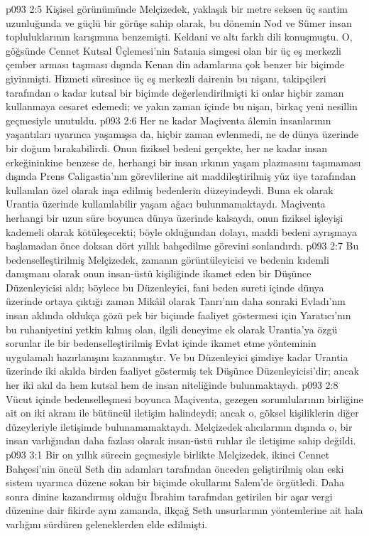 \vs p093 2:5 Kişisel görünümünde Melçizedek, yaklaşık bir metre seksen üç santim uzunluğunda ve güçlü bir görüşe sahip olarak, bu dönemin Nod ve Sümer insan topluluklarının karışımına benzemişti. Keldani ve altı farklı dili konuşmuştu. O, göğsünde Cennet Kutsal Üçlemesi’nin Satania simgesi olan bir üç eş merkezli çember arması taşıması dışında Kenan din adamlarına çok benzer bir biçimde giyinmişti. Hizmeti süresince üç eş merkezli dairenin bu nişanı, takipçileri tarafından o kadar kutsal bir biçimde değerlendirilmişti ki onlar hiçbir zaman kullanmaya cesaret edemedi; ve yakın zaman içinde bu nişan, birkaç yeni nesillin geçmesiyle unutuldu.
\vs p093 2:6 Her ne kadar Maçiventa âlemin insanlarının yaşantıları uyarınca yaşamışsa da, hiçbir zaman evlenmedi, ne de dünya üzerinde bir doğum bırakabilirdi. Onun fiziksel bedeni gerçekte, her ne kadar insan erkeğininkine benzese de, herhangi bir insan ırkının yaşam plazmasını taşımaması dışında Prens Caligastia’nın görevlilerine ait maddileştirilmiş yüz üye tarafından kullanılan özel olarak inşa edilmiş bedenlerin düzeyindeydi. Buna ek olarak Urantia üzerinde kullanılabilir yaşam ağacı bulunmamaktaydı. Maçiventa herhangi bir uzun süre boyunca dünya üzerinde kalsaydı, onun fiziksel işleyişi kademeli olarak kötüleşecekti; böyle olduğundan dolayı, maddi bedeni ayrışmaya başlamadan önce doksan dört yıllık bahşedilme görevini sonlandırdı.
\vs p093 2:7 Bu bedenselleştirilmiş Melçizedek, zamanın görüntüleyicisi ve bedenin kıdemli danışmanı olarak onun insan\hyp{}üstü kişiliğinde ikamet eden bir Düşünce Düzenleyicisi aldı; böylece bu Düzenleyici, fani beden sureti içinde dünya üzerinde ortaya çıktığı zaman Mikâil olarak Tanrı’nın daha sonraki Evladı’nın insan aklında oldukça gözü pek bir biçimde faaliyet göstermesi için Yaratıcı’nın bu ruhaniyetini yetkin kılmış olan, ilgili deneyime ek olarak Urantia’ya özgü sorunlar ile bir bedenselleştirilmiş Evlat içinde ikamet etme yönteminin uygulamalı hazırlanışını kazanmıştır. Ve bu Düzenleyici şimdiye kadar Urantia üzerinde iki akılda birden faaliyet göstermiş tek Düşünce Düzenleyicisi’dir; ancak her iki akıl da hem kutsal hem de insan niteliğinde bulunmaktaydı.
\vs p093 2:8 Vücut içinde bedenselleşmesi boyunca Maçiventa, gezegen sorumlularının birliğine ait on iki akranı ile bütüncül iletişim halindeydi; ancak o, göksel kişiliklerin diğer düzeyleriyle iletişimde bulunamamaktaydı. Melçizedek alıcılarının dışında o, bir insan varlığından daha fazlası olarak insan\hyp{}üstü ruhlar ile iletişime sahip değildi.
\vs p093 3:1 Bir on yıllık sürecin geçmesiyle birlikte Melçizedek, ikinci Cennet Bahçesi’nin öncül Seth din adamları tarafından önceden geliştirilmiş olan eski sistem uyarınca düzene sokan bir biçimde okullarını Salem’de örgütledi. Daha sonra dinine kazandırmış olduğu İbrahim tarafından getirilen bir aşar vergi düzenine dair fikirde aynı zamanda, ilkçağ Seth unsurlarının yöntemlerine ait hala varlığını sürdüren geleneklerden elde edilmişti.
